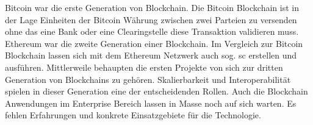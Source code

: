 Bitcoin war die erste Generation von Blockchain. Die Bitcoin Blockchain ist in der Lage Einheiten der Bitcoin Währung zwischen zwei Parteien zu versenden ohne das eine Bank oder eine Clearingstelle diese Transaktion validieren muss. \cite[vgl.]{Nakamoto2009} Ethereum war die zweite Generation einer Blockchain. Im Vergleich zur Bitcoin Blockchain lassen sich mit dem Ethereum Netzwerk auch sog. \ac{sc} erstellen und ausführen.\cite[vgl.]{Buterin2014} Mittlerweile behaupten die ersten Projekte von sich zur dritten Generation von Blockchains zu gehören. Skalierbarkeit und Interoperabilität spielen in dieser Generation eine der entscheidenden Rollen. \cite[vgl.]{Cardano} Auch die Blockchain Anwendungen im Enterprise Bereich lassen in Masse noch auf sich warten. Es fehlen Erfahrungen und konkrete Einsatzgebiete für die Technologie.

\newpage
